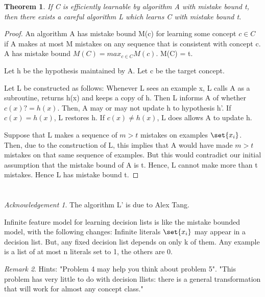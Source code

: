 \documentclass[10pt]{amsart}
\newtheorem{thm}{Theorem}[subsection]
\theoremstyle{remark}
\newtheorem*{ack}{Acknowledgement}
\newtheorem{rem}[thm]{Remark}
\begin{document}
\begin{thm}
If C is efficiently learnable by algorithm A with mistake bound t, then there exists a careful algorithm L which learns C with mistake bound t.
\end{thm}
\begin{proof}
An algorithm A has mistake bound M(c) for learning some concept $c \in C$ if A makes at most M mistakes on any sequence that is consistent with concept c. A has mistake bound $M(C) = max_{c \in C} M(c)$. M(C) = t.

Let h be the hypothesis maintained by A. Let c be the target concept.

Let L be constructed as follows: Whenever L sees an example x, L calls A as a subroutine, returns h(x) and keeps a copy of h. Then L informs A of whether $c(x) ?= h(x)$. Then, A may or may not update h to hypothesis h'. If $c(x) = h(x)$, L restores h. If $c(x) \neq h(x)$, L does allows A to update h.

Suppose that L makes a sequence of $m>t$ mistakes on examples $\set{x_{i}}$. Then, due to the construction of L, this implies that A would have made $m>t$ mistakes on that same sequence of examples. But this would contradict our initial assumption that the mistake bound of A is t. Hence, L cannot make more than t mistakes. Hence L has mistake bound t.
\end{proof}

\section{}
\begin{ack}
The algorithm L' is due to Alex Tang.
\end{ack}

Infinite feature model for learning decision lists is like the mistake bounded model, with the following changes: Infinite literals $\set{x_{i}}$ may appear in a decision list. But, any fixed decision list depends on only k of them. Any example is a list of at most n literals set to 1, the others are 0.

\begin{rem}
Hints: "Problem 4 may help you think about problem 5". "This problem has very little to do with decision llists: there is a general transformation that will work for almost any concept class."
\end{rem}
\end{document}
